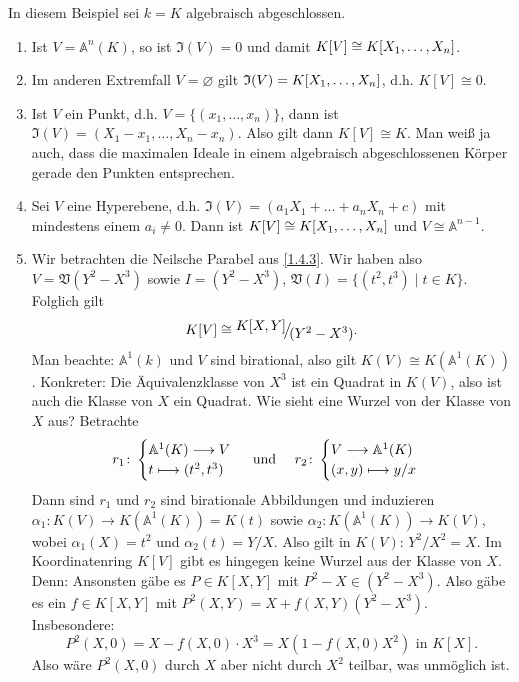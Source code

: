\documentclass[a4paper,12pt]{scrbook}
\def\A{\mathbb{A}}
\def\V{\mathfrak{V}}
\def\I{\mathfrak{I}}
\newcommand{\ra}{\longrightarrow}
\newcommand{\leer}{\ensuremath{\varnothing}}
\renewcommand{\mapsto}{\longmapsto}
\newcommand{\Quotient}[2]{
  \raisebox{0.7ex}{\ensuremath{#1}}
  \ensuremath{\mkern-3mu}\big/\ensuremath{\mkern-3mu}
  \raisebox{-0.6ex}{\ensuremath{#2}}}
\newcommand{\polyx}[1][n]{\ensuremath%
  [X_{1},\dotsc,X_{#1}]}
\begin{document}
\begin{bsp}\label{1.4.8} In diesem Beispiel sei $k=K$ algebraisch abgeschlossen.
\begin{enumerate}
\item{} Ist $V=\A^n(K)$, so ist $\I(V)=0$ und damit $K[V]\cong K\polyx$.
\item{} Im anderen Extremfall $V=\leer$ gilt $\I(V)=K\polyx$, d.h. $K[V]\cong 0$.
\item{} Ist $V$ ein Punkt, d.h. $V=\{(x_1,\dotsc,x_n)\}$, dann ist $\I(V)=(X_1-x_1,\dotsc,X_n-x_n)$. Also gilt dann $K[V]\cong K$. Man weiß ja auch, dass die maximalen Ideale in einem algebraisch abgeschlossenen Körper gerade den Punkten entsprechen.
\item{} Sei $V$ eine Hyperebene, d.h. $\I(V)=(a_1X_1+\dotsc+a_nX_n+c)$ mit mindestens einem $a_i\neq 0$.
Dann ist $K[V]\cong K\polyx$ und $V\cong \A^{n-1}$.
\item{} Wir betrachten die Neilsche Parabel aus \cref{1.4.3}. Wir haben also $V=\V(Y^2-X^3)$ sowie $I=(Y^2-X^3)$,
  $\V(I)=\{(t^2,t^3) \mid t\in K\}$. Folglich gilt
\[K[V]\cong \Quotient{K[X,Y]}{(Y^2-X^3)}.\] 
Man beachte: $\A^1(k)$ und $V$ sind birational, also gilt $K(V)\cong K(\A^1(K))$. Konkreter:
Die Äquivalenzklasse von $X^3$ ist ein Quadrat in $K(V)$, also ist auch die Klasse von $X$ ein Quadrat.
Wie sieht eine Wurzel von der Klasse von $X$ aus? Betrachte  
\[r_1\colon  \begin{cases} \A^1(K)\ra V \\ t\mapsto (t^2,t^3) \end{cases} \text{ und \quad  } r_2\colon  \begin{cases} V\ra \A^1(K) \\ (x,y) \mapsto y/x\end{cases}\]
Dann sind $r_1$ und $r_2$ sind birationale Abbildungen und induzieren $\alpha_1\colon  K(V)\ra K(\A^1(K))=K(t)$ sowie $\alpha_2\colon  K(\A^1(K))\ra K(V)$, wobei $\alpha_1(X)=t^2$ und $\alpha_2(t)=Y/X$. Also gilt in $K(V)$: $Y^2/X^2=X$.
Im Koordinatenring $K[V]$ gibt es hingegen keine Wurzel aus der Klasse von $X$. Denn:
Ansonsten gäbe es $P \in K[X,Y]$ mit $P^2-X \in (Y^2-X^3)$. Also gäbe es ein $f \in K[X,Y]$ mit $P^2(X,Y)=X+f(X,Y)(Y^2-X^3)$.
Insbesondere:
 \[P^2(X,0)=X-f(X,0)\cdot X^3=X(1-f(X,0)X^2)\text{ in } K[X].\]
 Also wäre $P^2(X,0)$ durch $X$ aber nicht durch $X^2$ teilbar, was unmöglich ist.
\end{enumerate}
\end{bsp}
\end{document}
